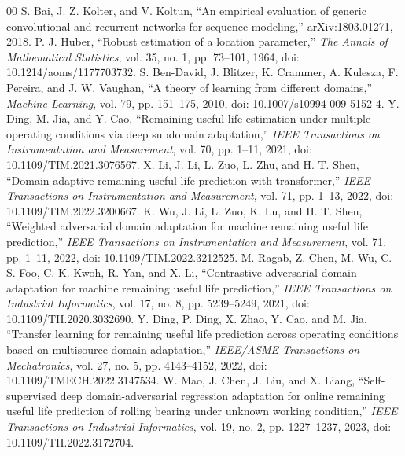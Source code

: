 \documentclass[journal]{IEEEtran}
\begin{document}
\begin{thebibliography}{00}
 S. Bai, J. Z. Kolter, and V. Koltun, ``An empirical evaluation of generic convolutional and recurrent networks for sequence modeling,'' arXiv:1803.01271, 2018.
 P. J. Huber, ``Robust estimation of a location parameter,'' \emph{The Annals of Mathematical Statistics}, vol. 35, no. 1, pp. 73--101, 1964, doi: 10.1214/aoms/1177703732.
 S. Ben-David, J. Blitzer, K. Crammer, A. Kulesza, F. Pereira, and J. W. Vaughan, ``A theory of learning from different domains,'' \emph{Machine Learning}, vol. 79, pp. 151--175, 2010, doi: 10.1007/s10994-009-5152-4.
 Y. Ding, M. Jia, and Y. Cao, ``Remaining useful life estimation under multiple operating conditions via deep subdomain adaptation,'' \emph{IEEE Transactions on Instrumentation and Measurement}, vol. 70, pp. 1--11, 2021, doi: 10.1109/TIM.2021.3076567.
 X. Li, J. Li, L. Zuo, L. Zhu, and H. T. Shen, ``Domain adaptive remaining useful life prediction with transformer,'' \emph{IEEE Transactions on Instrumentation and Measurement}, vol. 71, pp. 1--13, 2022, doi: 10.1109/TIM.2022.3200667.
 K. Wu, J. Li, L. Zuo, K. Lu, and H. T. Shen, ``Weighted adversarial domain adaptation for machine remaining useful life prediction,'' \emph{IEEE Transactions on Instrumentation and Measurement}, vol. 71, pp. 1--11, 2022, doi: 10.1109/TIM.2022.3212525.
 M. Ragab, Z. Chen, M. Wu, C.-S. Foo, C. K. Kwoh, R. Yan, and X. Li, ``Contrastive adversarial domain adaptation for machine remaining useful life prediction,'' \emph{IEEE Transactions on Industrial Informatics}, vol. 17, no. 8, pp. 5239--5249, 2021, doi: 10.1109/TII.2020.3032690.
 Y. Ding, P. Ding, X. Zhao, Y. Cao, and M. Jia, ``Transfer learning for remaining useful life prediction across operating conditions based on multisource domain adaptation,'' \emph{IEEE/ASME Transactions on Mechatronics}, vol. 27, no. 5, pp. 4143--4152, 2022, doi: 10.1109/TMECH.2022.3147534.
 W. Mao, J. Chen, J. Liu, and X. Liang, ``Self-supervised deep domain-adversarial regression adaptation for online remaining useful life prediction of rolling bearing under unknown working condition,'' \emph{IEEE Transactions on Industrial Informatics}, vol. 19, no. 2, pp. 1227--1237, 2023, doi: 10.1109/TII.2022.3172704.
\end{thebibliography}
\end{document}
